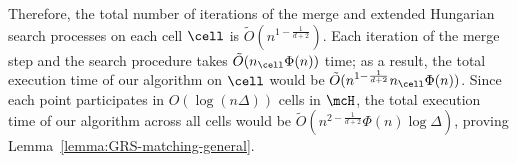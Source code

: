 Therefore, the total number of iterations of the merge and extended Hungarian search processes on each cell $\cell$ is $\tilde{O}(n^{1-\frac{1}{d+2}})$. Each iteration of the merge step and the search procedure takes $\tilde{O}(n_\cell\Phi(n))$ time; as a result, the total execution time of our algorithm on $\cell$ would be $\tilde{O}(n^{1-\frac{1}{d+2}}n_\cell\Phi(n))$. Since each point participates in $O(\log(n\Delta))$ cells in $\mcH$, the total execution time of our algorithm across all cells would be $\tilde{O}(n^{2-\frac{1}{d+2}}\Phi(n)\log\Delta)$, proving Lemma~\ref{lemma:GRS-matching-general}.




